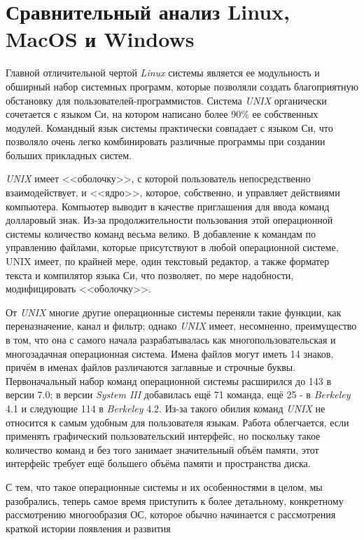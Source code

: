\section{Сравнительный анализ Linux, MacOS и Windows}

Главной отличительной чертой \textit{Linux} системы является ее модульность и обширный набор системных программ, которые позволяли создать благоприятную обстановку для пользователей-программистов. Система \textit{UNIX} органически сочетается с языком Си, на котором написано более 90\% ее собственных модулей. Командный язык системы практически совпадает с языком Си, что позволяло очень легко комбинировать различные программы при создании больших прикладных систем.

\textit{UNIX} имеет <<оболочку>>, с которой пользователь непосредственно взаимодействует, и <<ядро>>, которое, собственно, и управляет действиями компьютера. Компьютер выводит в качестве приглашения для ввода команд долларовый знак. Из-за продолжительности пользования этой операционной системы количество команд весьма велико. В добавление к командам по управлению файлами, которые присутствуют в любой операционной системе, UNIX имеет, по крайней мере, один текстовый редактор, а также форматер текста и компилятор языка Си, что позволяет, по мере надобности, модифицировать <<оболочку>>.

От \textit{UNIX} многие другие операционные системы переняли такие функции, как переназначение, канал и фильтр; однако \textit{UNIX} имеет, несомненно, преимущество в том, что она с самого начала разрабатывалась как многопользовательская и многозадачная операционная система. Имена файлов могут иметь 14 знаков, причём в именах файлов различаются заглавные и строчные буквы. Первоначальный набор команд операционной системы расширился до 143 в версии 7.0; в версии \textit{System III} добавилась ещё 71 команда, ещё 25 - в \textit{Berkeley} 4.1 и следующие 114 в \textit{Berkeley} 4.2. Из-за такого обилия команд \textit{UNIX} не относится к самым удобным для пользователя языкам. Работа облегчается, если применять графический пользовательский интерфейс, но поскольку такое количество команд и без того занимает значительный объём памяти, этот интерфейс требует ещё большего объёма памяти и пространства диска.

С тем, что такое операционные системы и их особенностями в целом, мы разобрались, теперь самое время приступить к более детальному, конкретному рассмотрению многообразия ОС, которое обычно начинается с рассмотрения краткой истории появления и развития

